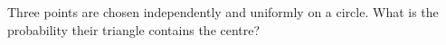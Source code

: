 Three points are chosen independently and uniformly on a circle. What is the probability their triangle contains the centre?
